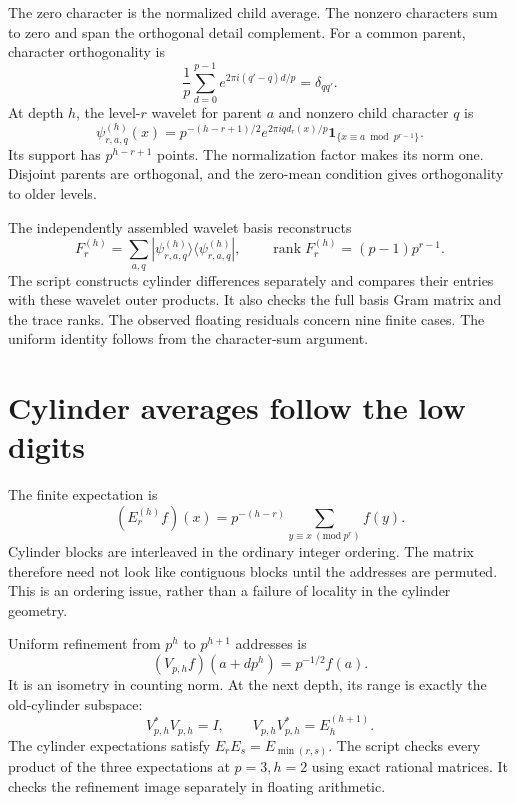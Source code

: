 The zero character is the normalized child average. The nonzero characters sum to zero and span the orthogonal detail complement. For a common parent, character orthogonality is
\[
\frac1p\sum_{d=0}^{p-1}e^{2\pi i(q'-q)d/p}=\delta_{qq'}.
\]
At depth $h$, the level-$r$ wavelet for parent $a$ and nonzero child character $q$ is
\[
\psi_{r,a,q}^{(h)}(x)
=p^{-(h-r+1)/2}e^{2\pi iq d_r(x)/p}
\mathbf1_{\{x\equiv a\bmod p^{r-1}\}}.
\]
Its support has $p^{h-r+1}$ points. The normalization factor makes its norm one. Disjoint parents are orthogonal, and the zero-mean condition gives orthogonality to older levels.

The independently assembled wavelet basis reconstructs
\[
F_r^{(h)}=\sum_{a,q}|\psi_{r,a,q}^{(h)}\rangle\langle\psi_{r,a,q}^{(h)}|,
\qquad \operatorname{rank}F_r^{(h)}=(p-1)p^{r-1}.
\]
The script constructs cylinder differences separately and compares their entries with these wavelet outer products. It also checks the full basis Gram matrix and the trace ranks. The observed floating residuals concern nine finite cases. The uniform identity follows from the character-sum argument.



\clearpage
\section{Cylinder averages follow the low digits}

The finite expectation is
\[
(E_r^{(h)}f)(x)=p^{-(h-r)}
\sum_{y\equiv x\ (\mathrm{mod}\ p^r)}f(y).
\]
Cylinder blocks are interleaved in the ordinary integer ordering. The matrix therefore need not look like contiguous blocks until the addresses are permuted. This is an ordering issue, rather than a failure of locality in the cylinder geometry.

Uniform refinement from $p^h$ to $p^{h+1}$ addresses is
\[
(V_{p,h}f)(a+dp^h)=p^{-1/2}f(a).
\]
It is an isometry in counting norm. At the next depth, its range is exactly the old-cylinder subspace:
\[
V_{p,h}^*V_{p,h}=I,\qquad
V_{p,h}V_{p,h}^*=E_h^{(h+1)}.
\]
The cylinder expectations satisfy $E_rE_s=E_{\min(r,s)}$. The script checks every product of the three expectations at $p=3,h=2$ using exact rational matrices. It checks the refinement image separately in floating arithmetic.

